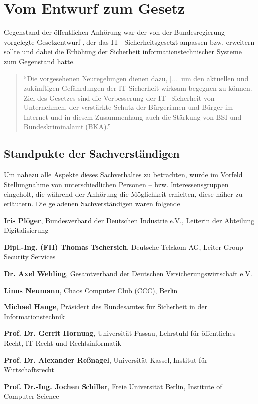\documentclass[a4paper,letterpaper,twocolumn,10pt,ngerman]{article}
\newcommand{\descitem}[1]{\textbf{#1}}	%
\begin{document}
\section{Vom Entwurf zum Gesetz}
\label{sec:EntwurfzumGesetz}
Gegenstand der öffentlichen Anhörung  war der von der Bundesregierung vorgelegte Gesetzentwurf \cite{GesEntw15}, der das IT~-Sicherheitsgesetzt anpassen bzw. erweitern sollte und dabei die Erhöhung der Sicherheit informationstechnischer Systeme zum Gegenstand hatte. 
\begin{quotation}
"`Die vorgesehenen Neuregelungen dienen dazu, [...] um den aktuellen und zukünftigen Gefährdungen der IT-Sicherheit wirksam begegnen zu können. Ziel des Gesetzes sind die Verbesserung der IT~-Sicherheit von Unternehmen, der verstärkte Schutz der Bürgerinnen und Bürger im Internet und in diesem Zusammenhang auch die Stärkung von BSI und Bundeskriminalamt (BKA)."' \cite[S. 1]{GesEntw15} 
\end{quotation}

\subsection{Standpukte der Sachverständigen}
\label{subsec:StandpunkteSachverständige}
Um nahezu alle Aspekte dieses Sachverhaltes zu betrachten, wurde im Vorfeld Stellungnahme von unterschiedlichen Personen -- bzw. Interessensgruppen eingeholt, die während der Anhörung die Möglichkeit erhielten, diese näher zu erläutern. Die geladenen Sachverständigen waren folgende

\begin{description*}
    \item	{\descitem{Iris Plöger}}, Bundesverband der Deutschen Industrie e.V., Leiterin der Abteilung Digitalisierung
    \item	{\descitem{Dipl.-Ing.  (FH) Thomas Tschersich}}, Deutsche Telekom AG, Leiter Group Security Services
    \item	{\descitem{Dr. Axel Wehling}}, Gesamtverband der Deutschen Versicherungswirtschaft e.V.
    \item	{\descitem{Linus Neumann}}, Chaos Computer Club (CCC), Berlin

	\item	{\descitem{Michael Hange}}, Präsident des Bundesamtes für Sicherheit in der Informationstechnik
    \item	{\descitem{Prof. Dr. Gerrit Hornung}}, Universität Passau, Lehrstuhl für öffentliches Recht, IT-Recht und Rechtsinformatik
    \item	{\descitem{Prof. Dr. Alexander Roßnagel}}, Universität Kassel, Institut für Wirtschaftsrecht
    \item	{\descitem{Prof. Dr.-Ing. Jochen Schiller}}, Freie Universität Berlin, Institute of Computer Science
\end{description*}
\end{document}
